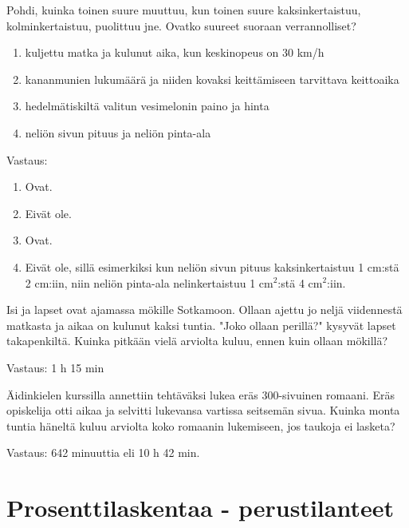 \begin{tehtava}
Pohdi, kuinka toinen suure muuttuu, kun toinen suure kaksinkertaistuu, kolminkertaistuu, puolittuu jne. Ovatko suureet suoraan verrannolliset?
\begin{enumerate}
\item kuljettu matka ja kulunut aika, kun keskinopeus on 30 km/h
\item kananmunien lukumäärä ja niiden kovaksi keittämiseen tarvittava keittoaika
\item hedelmätiskiltä valitun vesimelonin paino ja hinta
\item neliön sivun pituus ja neliön pinta-ala
\end{enumerate}
\begin{vastaus}
Vastaus:
\begin{enumerate}
\item Ovat.
\item Eivät ole.
\item Ovat.
\item Eivät ole, sillä esimerkiksi kun neliön sivun pituus kaksinkertaistuu 1 cm:stä 2 cm:iin, niin neliön pinta-ala nelinkertaistuu 1 cm$^2$:stä 4 cm$^2$:iin.
\end{enumerate}
\end{vastaus}
\end{tehtava}

\begin{tehtava}
Isi ja lapset ovat ajamassa mökille Sotkamoon. Ollaan ajettu jo neljä viidennestä matkasta ja aikaa on kulunut kaksi tuntia. "Joko ollaan perillä?" kysyvät lapset takapenkiltä. Kuinka pitkään vielä arviolta kuluu, ennen kuin ollaan mökillä?
\begin{vastaus}
Vastaus: 1 h 15 min
\end{vastaus}
\end{tehtava}

\begin{tehtava}
Äidinkielen kurssilla annettiin tehtäväksi lukea eräs 300-sivuinen romaani. Eräs opiskelija otti aikaa ja selvitti lukevansa vartissa seitsemän sivua. Kuinka monta tuntia häneltä kuluu arviolta koko romaanin lukemiseen, jos taukoja ei lasketa?
\begin{vastaus}
Vastaus: 642 minuuttia eli 10 h 42 min.
\end{vastaus}
\end{tehtava}

\chapter{Prosenttilaskentaa - perustilanteet}

